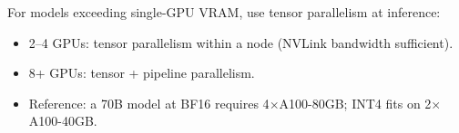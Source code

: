 For models exceeding single-GPU VRAM, use tensor parallelism at inference:
\begin{itemize}
  \item 2--4 GPUs: tensor parallelism within a node (NVLink bandwidth sufficient).
  \item 8+ GPUs: tensor + pipeline parallelism.
  \item Reference: a 70B model at BF16 requires 4$\times$A100-80GB; INT4 fits on 2$\times$A100-40GB.
\end{itemize}


